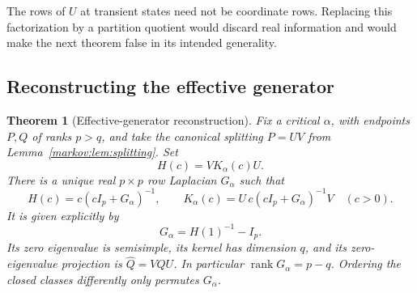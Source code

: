 \documentclass[11pt]{article}
\numberwithin{equation}{section}
\newtheorem{theorem}{Theorem}[section]
\theoremstyle{definition}
\theoremstyle{remark}
\newcommand{\rank}{\operatorname{rank}}
\begin{document}
The rows of $U$ at transient states need not be coordinate rows. Replacing this
factorization by a partition quotient would discard real information and would
make the next theorem false in its intended generality.

\subsection{Reconstructing the effective generator}

\begin{theorem}[Effective-generator reconstruction]\label{markov:thm:effective}
Fix a critical $\alpha$, with endpoints $P,Q$ of ranks $p>q$, and take the
canonical splitting $P=UV$ from Lemma~\ref{markov:lem:splitting}. Set
\[
 H(c)=VK_\alpha(c)U.
\]
There is a unique real $p\times p$ row Laplacian $G_\alpha$ such that
\begin{equation}\label{markov:eq:effective-resolvent}
 H(c)=c(cI_p+G_\alpha)^{-1},\qquad
 K_\alpha(c)=U\,c(cI_p+G_\alpha)^{-1}V
 \quad(c>0).
\end{equation}
It is given explicitly by
\begin{equation}\label{markov:eq:effective-one}
 G_\alpha=H(1)^{-1}-I_p.
\end{equation}
Its zero eigenvalue is semisimple, its kernel has dimension $q$, and its
zero-eigenvalue projection is $\widehat Q=VQU$. In particular
$\rank G_\alpha=p-q$. Ordering the closed classes differently only permutes
$G_\alpha$.
\end{theorem}
\end{document}
